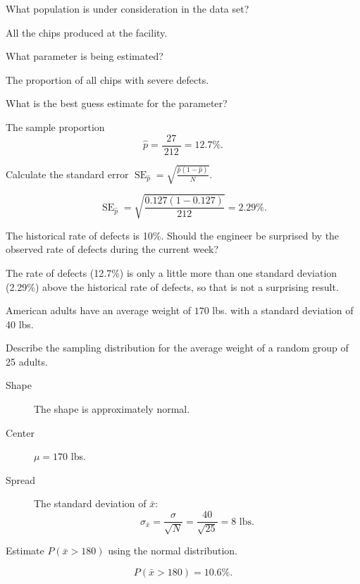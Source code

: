 \documentclass[12pt,answers]{exam}
\newcounter{countA}
\begin{document}
\begin{questions}
  \begin{parts}
  \item
    What population is under consideration in the data set?
\begin{solution}
All the chips produced at the facility.
\end{solution}
\vfill
  \item
    What parameter is being estimated?
\begin{solution}
The proportion of all chips with severe defects. 
\end{solution}
\vfill
  \item
    What is the best guess estimate for the parameter?
\begin{solution}
The sample proportion
$$\hat{p} = \frac{ 27 }{~ 212 ~} = 12.7\%.$$
\end{solution}
\vfill
  \item
    Calculate the standard error $\displaystyle \operatorname{SE}_{\hat{p}} = \sqrt{\frac{\hat{p}(1-\hat{p})}{N}}.$
\begin{solution}
$$\operatorname{SE}_{\hat{p}} = \sqrt{\frac{ 0.127 (1-0.127) }{ 212 }} = 2.29\%.$$
\end{solution}
\vfill
  \item
    The historical rate of defects is 10\%. Should the engineer be
    surprised by the observed rate of defects during the current week?
\begin{solution}
The rate of defects (12.7\%) is only a little more than one standard deviation (2.29\%) above the historical rate of defects, so that is not a surprising result. 
\end{solution}
\vfill
  \end{parts}
\item
  American adults have an average weight of \(170\) lbs. with a standard
  deviation of 40 lbs.

  \begin{parts}
  \item
    Describe the sampling distribution for the average weight of a
    random group of 25 adults.
\begin{solution}
\begin{description}
\item[Shape] The shape is approximately normal.
\item[Center] $\mu = 170$ lbs.
\item[Spread] The standard deviation of $\bar{x}$:
$$\sigma_{\bar{x}} = \frac{\sigma}{\sqrt{N}} = \frac{40}{\sqrt{25}} = 8 \text{ lbs}.$$
\end{description}
\end{solution}
\vfill
  \item
    Estimate \(P(\bar{x} > 180)\) using the normal distribution.
\begin{solution}
$$P(\bar{x} > 180) = 10.6\%.$$
\end{solution}
\vfill
  \end{parts}

\setcounter{countA}{\value{question}}
\end{questions}
\end{document}
